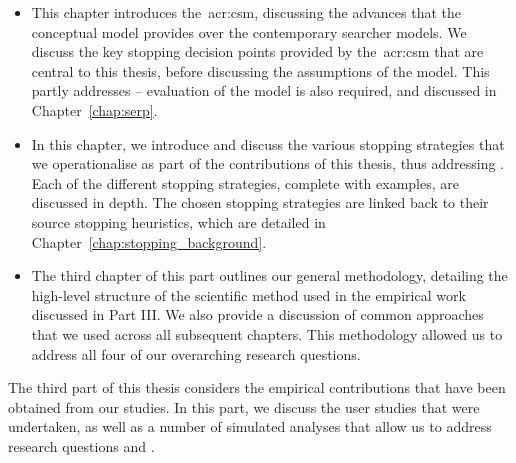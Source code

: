 \begin{itemize}
    \item[]{ This chapter introduces the~\gls{acr:csm}, discussing the advances that the conceptual model provides over the contemporary searcher models. We discuss the key stopping decision points provided by the~\gls{acr:csm} that are central to this thesis, before discussing the assumptions of the model. This partly addresses  -- evaluation of the model is also required, and discussed in Chapter~\ref{chap:serp}.}
    
    \item[]{ In this chapter, we introduce and discuss the various stopping strategies that we operationalise as part of the contributions of this thesis, thus addressing . Each of the different stopping strategies, complete with examples, are discussed in depth. The chosen stopping strategies are linked back to their source stopping heuristics, which are detailed in Chapter~\ref{chap:stopping_background}.}
    
    \item[]{ The third chapter of this part outlines our general methodology, detailing the high-level structure of the scientific method used in the empirical work discussed in Part III. We also provide a discussion of common approaches that we used across all subsequent chapters. This methodology allowed us to address all four of our overarching research questions.}
\end{itemize}

\noindent
{}
The third part of this thesis considers the empirical contributions that have been obtained from our studies. In this part, we discuss the user studies that were undertaken, as well as a number of simulated analyses that allow us to address research questions  and .

